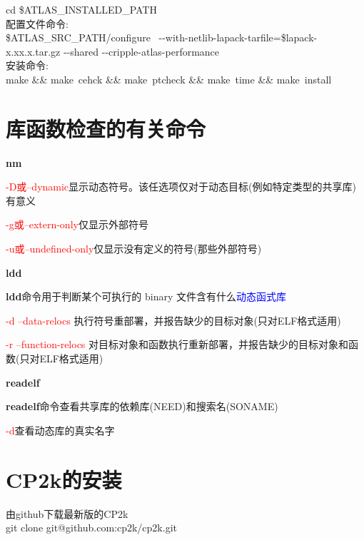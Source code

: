 \documentclass[10pt,a4paper]{article}
\begin{document}
\textrm{cd \$ATLAS\_INSTALLED\_PATH}\\ 
配置文件命令:\\
\textrm{\$ATLAS\_SRC\_PATH/configure ~-\/-with-netlib-lapack-tarfile=\$lapack-x.xx.x.tar.gz -\/-shared -\/-cripple-atlas-performance}\\
安装命令:\\
\textrm{make \&\& make~cehck \&\& make~ptcheck \&\& make~time \&\& make~install}

\section{库函数检查的有关命令}
\textbf{nm}

\textcolor{red}{-D或--dynamic}\;\;显示动态符号。该任选项仅对于动态目标(例如特定类型的共享库)有意义

\textcolor{red}{-g或--extern-only}\;\;仅显示外部符号

\textcolor{red}{-u或--undefined-only}\;\;仅显示没有定义的符号(那些外部符号)

\textbf{ldd}

\textbf{ldd}命令用于判断某个可执行的 binary 文件含有什么\textcolor{blue}{动态函式库}

\textcolor{red}{-d --data-relocs}\;\; 执行符号重部署，并报告缺少的目标对象(只对ELF格式适用)

\textcolor{red}{-r --function-relocs}\;\; 对目标对象和函数执行重新部署，并报告缺少的目标对象和函数(只对ELF格式适用)

\textbf{readelf}

\textbf{readelf}命令查看共享库的依赖库(\textrm{NEED})和搜索名(\textrm{SONAME})

\textcolor{red}{-d}\;\;查看动态库的真实名字

\section{\rm{CP2k}的安装}
由\textrm{github}下载最新版的\textrm{CP2k}\\
\textrm{git clone git@github.com:cp2k/cp2k.git}
\end{document}
